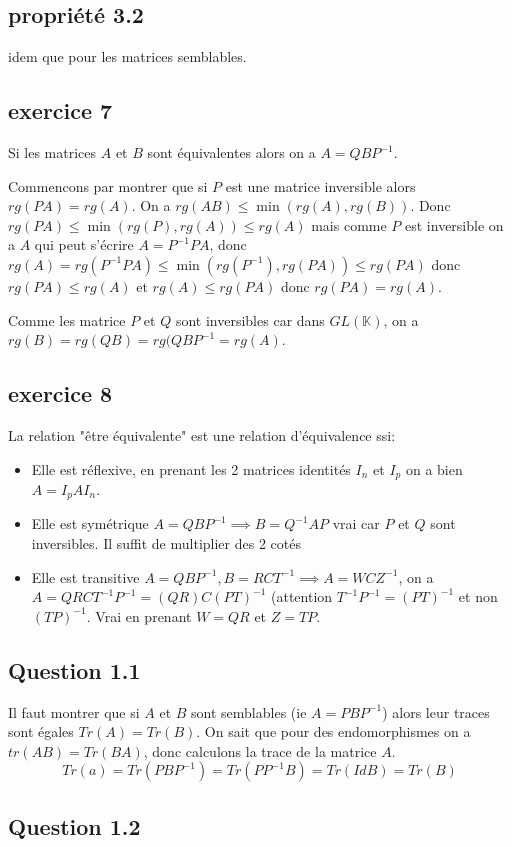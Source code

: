 \documentclass[]{book}
\theoremstyle{definition}
\newcommand{\bb}[1]{\mathbb{#1}}
\newcommand{\K}{\bb{K}}
\begin{document}
\newpage

\subsection{propri\'et\'e 3.2}
idem que pour les matrices semblables.

\subsection{exercice 7}
Si les matrices $A$ et $B$ sont \'equivalentes alors on a $A=QBP^{-1}$. 

Commencons par montrer que si $P$ est une matrice inversible alors $rg(PA) = rg(A)$. On a $rg(AB) \leq \min(rg(A), rg(B))$. Donc $rg(PA) \leq \min(rg(P), rg(A)) \leq rg(A)$ mais comme $P$ est inversible on a $A$ qui peut s'\'ecrire $A = P^{-1}PA$, donc $rg(A) = rg(P^{-1}PA) \leq \min(rg(P^{-1}), rg(PA)) \leq rg(PA)$ donc $rg(PA) \leq rg(A) \text{ et } rg(A) \leq rg(PA)$ donc $rg(PA) = rg(A)$. 

Comme les matrice $P$ et $Q$ sont inversibles car dans $GL(\K)$, on a $rg(B) = rg(QB) = rg(QBP^{-1} = rg(A)$.  

\subsection{exercice 8}
La relation "\^etre \'equivalente" est une relation d'\'equivalence ssi:
\begin{itemize}
\item Elle est r\'eflexive, en prenant les 2 matrices identit\'es $I_n$ et $I_p$ on a bien $ A = I_p A I_n$. 
\item Elle est sym\'etrique $A = QBP^{-1} \implies B = Q^{-1}AP$ vrai car $P$ et $Q$ sont inversibles. Il suffit de multiplier des 2 cot\'es
\item Elle est transitive $A = QBP^{-1}, B = RCT^{-1} \implies A = WCZ^{-1}$, on a $A=QRCT^{-1}P^{-1} = (QR)C(PT)^{-1}$ (attention $T^{-1}P^{-1} = (PT)^{-1}$ et non $(TP)^{-1}$. Vrai en prenant $W=QR$ et $Z=TP$.
\end{itemize}

\subsection*{Question 1.1}
Il faut montrer que si $A$ et $B$ sont semblables (ie $A = PBP^{-1}$) alors leur traces sont \'egales $Tr(A) = Tr(B)$. On sait que pour des endomorphismes on a $tr(AB) = Tr(BA)$, donc calculons la trace de la matrice $A$. 
$$
Tr(a) = Tr(PBP^{-1}) = Tr(PP^{-1}B) = Tr(IdB) = Tr(B) 
$$

\subsection*{Question 1.2}
\end{document}
